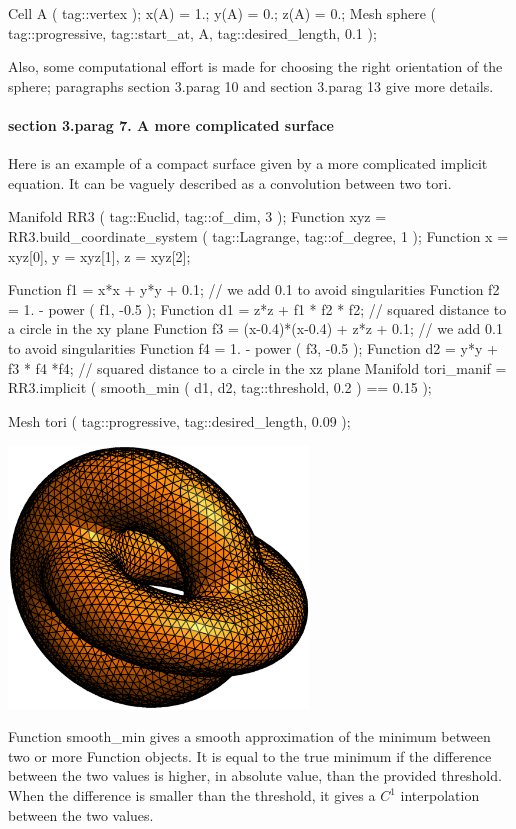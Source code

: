 \verbatim
   Cell A ( tag::vertex );  x(A) = 1.;  y(A) = 0.;  z(A) = 0.;
   Mesh sphere ( tag::progressive, tag::start_at, A, tag::desired_length, 0.1 );
\endverbatim

Also, some computational effort is made for choosing the right orientation of the sphere;
paragraphs \numb section 3.\numb parag 10 and \numb section 3.\numb parag 13 give more details.


\paragraph{\numb section 3.\numb parag 7. A more complicated surface}

Here is an example of a compact surface given by a more complicated implicit equation.
It can be vaguely described as a convolution between two tori.

\verbatim
   Manifold RR3 ( tag::Euclid, tag::of_dim, 3 );
   Function xyz = RR3.build_coordinate_system ( tag::Lagrange, tag::of_degree, 1 );
   Function x = xyz[0],  y = xyz[1],  z = xyz[2];

   Function f1 = x*x + y*y + 0.1;  // we add 0.1 to avoid singularities
   Function f2 = 1. - power ( f1, -0.5 );
   Function d1 = z*z + f1 * f2 * f2;  // squared distance to a circle in the xy plane
   Function f3 = (x-0.4)*(x-0.4) + z*z + 0.1;  // we add 0.1 to avoid singularities
   Function f4 = 1. - power ( f3, -0.5 );
   Function d2 = y*y + f3 * f4 *f4;  // squared distance to a circle in the xz plane
   Manifold tori_manif = RR3.implicit
      ( smooth_min ( d1, d2, tag::threshold, 0.2 ) == 0.15 );

   Mesh tori ( tag::progressive, tag::desired_length, 0.09 );
\endverbatim

\centerline{\includegraphics[width=80mm]{two-tori.eps}}

Function {\codett smooth\_min} gives a smooth approximation of the minimum between two or more
{\codett Function} objects.
It is equal to the true minimum if the difference between the two values is higher, in
absolute value, than the provided threshold.
When the difference is smaller than the threshold, it gives a $ C^1 $ interpolation between
the two values.

